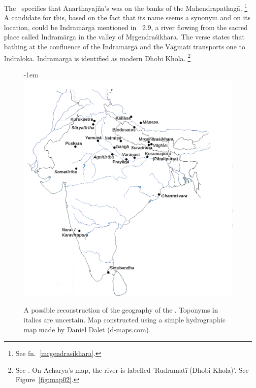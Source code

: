 The \VSS\ specifies that Anarthayajña's  was
on the banks of the Mahendrapathagā.%
		 \footnote{See fn.~\ref{mrgendrasikhara}.}
A candidate for this, based on the fact that its name seems a synonym and on its location,
could be Indramārgā mentioned in \Vagmati\ 2.9,
a river flowing from the sacred place 
called Indramārga in the valley of Mṛgendraśikhara.
 The verse states that bathing at the confluence of the
Indramārgā and the Vāgmatī transports one to Indraloka. Indramārgā
is identified as modern Dhobi Khola.%
        \footnote{See . On
                Acharya's map, the river is labelled 'Rudramatī (Dhobi Khola)'. See
               Figure~\ref{fig:map02}.}


\begin{figure}[!]
\leftskip-1em\includegraphics[scale=.35]{images/simplemap.png}
\caption[Geography of the \VSS]{A possible reconstruction of the  geography of the \VSS. Toponyms in italics are uncertain. Map constructed using a simple hydrographic map made by Daniel Dalet (d-maps.com).\label{fig:map01}}
\end{figure}

